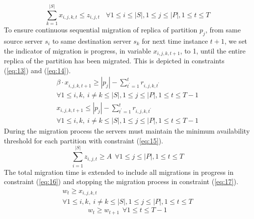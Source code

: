 \begin{equation}
\sum_{k=1}^{\left\vert{}S\right\vert{}}x_{i,j,k,t}\leq{}z_{i,j,t}   \ \ \ \  \forall{}1\leq{}i\leq{}\left\vert{}S\right\vert{},1\leq{}j\leq{}\left\vert{}P\right\vert{},1\leq{}t\leq{}T
\label{eq:12}
\end{equation}
To ensure continuous sequential migration of replica of partition $p_{j}$, from same source server $s_{i}$ to same destination server $s_{k}$ for next time instance $t+1$, we set the indicator of migration is progress, in variable $x_{i,j,k,t+1}$, to 1, until the entire replica of the partition has been migrated. This is depicted in constraints (\ref{eq:13}) and (\ref{eq:14}). 
\vspace{-5mm}
\begin{multline}
{\beta{}\cdot{}x}_{i,j,k,t+1}\geq{}\left\vert{}p_j\right\vert{}-\sum_{t^{'}=1}^tr_{i,j,k,t^{'}} \\ \forall{}1\leq{}i,k,\
i\not=k\leq{}\left\vert{}S\right\vert{},1\leq{}j\leq{}\left\vert{}P\right\vert{},1\leq{}t\leq{}T-1
\label{eq:13}
\end{multline}
\vspace{-10mm}
\begin{multline}
x_{i,j,k,t+1}\leq{}\left\vert{}p_j\right\vert{}-\sum_{t^{'}=1}^tr_{i,j,k,t^{'}}\ \\ \forall{}1\leq{}i,k,\
i\not=k\leq{}\left\vert{}S\right\vert{},1\leq{}j\leq{}\left\vert{}P\right\vert{},1\leq{}t\leq{}T-1
\label{eq:14}
\end{multline}
During the migration process the servers must maintain the minimum availability threshold for each partition with constraint (\ref{eq:15}).
\begin{equation}
\sum_{i=1}^{\left\vert{}S\right\vert{}}z_{i,j,t}\geq{}A\ \  \forall{}1\leq{}j\leq{}\left\vert{}P\right\vert{},1\leq{}t\leq{}T
\label{eq:15}
\end{equation}
The total migration time is extended to include all migrations in progress in constraint (\ref{eq:16}) and stopping the migration process in constraint (\ref{eq:17}).
\vspace{-3mm}
\begin{multline}
w_t\geq{}x_{i,j,k,t}\ \\ \forall{}1\leq{}i,k,\
i\not=k\leq{}\left\vert{}S\right\vert{},1\leq{}j\leq{}\left\vert{}P\right\vert{},1\leq{}t\leq{}T
\label{eq:16}
\end{multline}
\begin{equation}
w_t\geq{}w_{t+1}\  \ \forall 1\leq{}t\leq{}T-1
\label{eq:17}
\end{equation}
\vspace{-3mm}
